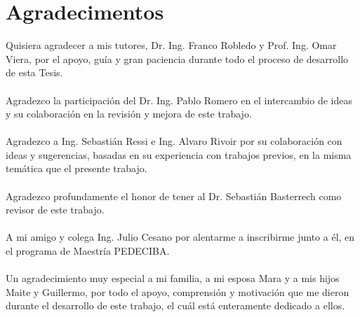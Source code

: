 \chapter*{Agradecimentos}

Quisiera agradecer a mis tutores, Dr. Ing. Franco Robledo y Prof. Ing. Omar Viera, por el apoyo, gu\'ia y gran paciencia durante todo el proceso de desarrollo de esta Tesis.\\ \\

Agradezco la participación del Dr. Ing. Pablo Romero en el intercambio de ideas y su colaboraci\'on en la revisi\'on y mejora de este trabajo.\\ \\

Agradezco a Ing. Sebasti\'an Ressi e Ing. Alvaro Rivoir por su colaboraci\'on con ideas y sugerencias, basadas en su experiencia con trabajos previos, en la misma tem\'atica que el presente trabajo.\\ \\

Agradezco profundamente el honor de tener al Dr. Sebasti\'an Basterrech como revisor de este trabajo.
\\ \\

A mi amigo y colega Ing. Julio Cesano por alentarme a inscribirme junto a \'el, en el programa de Maestr\'ia PEDECIBA.
\\ \\

Un agradecimiento muy especial a mi familia, a mi esposa Mara y a mis hijos Maite y Guillermo, por todo el apoyo, comprensi\'on y motivaci\'on que me dieron durante el desarrollo de este trabajo, el cu\'al est\'a enteramente dedicado a ellos.
